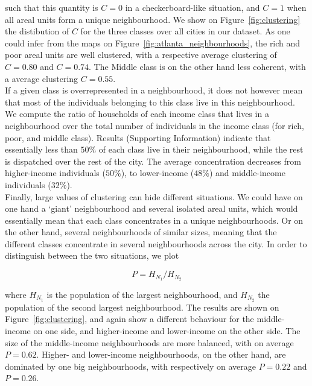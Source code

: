 such that this quantity is $C = 0$ in a checkerboard-like situation, and $C = 1$
when all areal units form a unique neighbourhood. We show on
Figure~\ref{fig:clustering} the distibution of $C$ for the three classes over all
cities in our dataset. As one could infer from the maps on
Figure~\ref{fig:atlanta_neighbourhoods}, the rich and poor areal units are well
clustered, with a respective average clustering of $C = 0.80$ and $C = 0.74$.
The Middle class is on the other hand less coherent, with a average clustering
$C = 0.55$.\\


If a given class is overrepresented in a neighbourhood, it does not however mean
that most of the individuals belonging to this class live in this neighbourhood.
We compute the ratio of households of each income class that lives in a
neighbourhood over the total number of individuals in the income class (for
rich, poor, and middle class).  Results (Supporting Information) indicate that
essentially less than $50\%$ of each class live in their neighbourhood, while
the rest is dispatched over the rest of the city. The average concentration
decreases from higher-income individuals ($50\%$), to lower-income ($48\%$) and
middle-income individuals ($32\%$).\\

Finally, large values of clustering can hide different situations. We
could have on one hand a `giant' neighbourhood and several isolated areal units, which
would essentially mean that each class concentrates in a unique
neighbourhoods. Or on the other hand, several neighbourhoods of
similar sizes, meaning that the different classes concentrate in
several neighbourhoods across the city. In order to distinguish
between the two situations, we plot

\begin{equation} 
    P = H_{N_1} / H_{N_2} 
\end{equation}

where $H_{N_1}$ is the population of the largest neighbourhood, and $H_{N_2}$
the population of the second largest neighbourhood. The results are shown on
Figure~\ref{fig:clustering}, and again show a different behaviour for the
middle-income on one side, and higher-income and lower-income on the other side.
The size of the middle-income neighbourhoods are more balanced, with on average
$P=0.62$.  Higher- and lower-income neighbourhoods, on the other hand, are
dominated by one big neighbourhoods, with respectively on average $P=0.22$ and
$P=0.26$.


